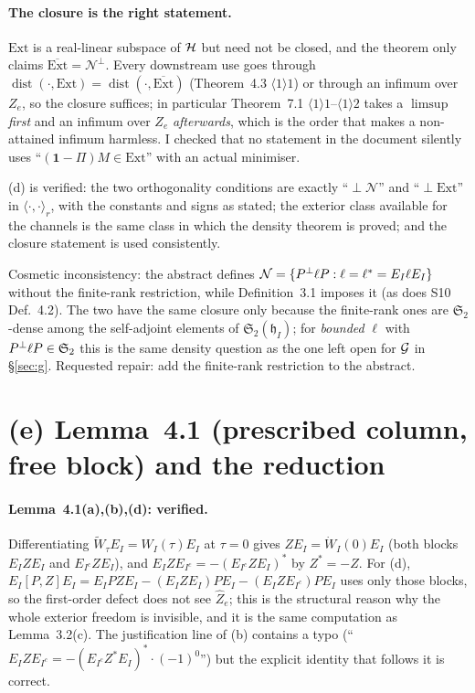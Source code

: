 \documentclass[11pt]{article}
\newcommand{\Wt}{\widetilde W}\newcommand{\Om}{\Omega}\newcommand{\Gm}{\Gamma}
\newcommand{\Stwo}{\mathfrak S_2}\newcommand{\Sone}{\mathfrak S_1}
\newcommand{\ip}[2]{\langle #1,#2\rangle}\newcommand{\one}{\mathbf 1}
\newcommand{\Ext}{\mathrm{Ext}}\newcommand{\Nvis}{\mathcal N}
\DeclareMathOperator{\dist}{dist}\DeclareMathOperator{\ran}{ran}
\begin{document}
\paragraph{The closure is the right statement.}  $\Ext$ is a real-linear subspace of $\mathcal H$
but need not be closed, and the theorem only claims $\overline{\Ext}=\Nvis^{\perp}$.  Every
downstream use goes through $\dist(\cdot,\Ext)=\dist(\cdot,\overline{\Ext})$
(Theorem~4.3 $\langle1\rangle1$) or through an infimum over $Z_e$, so the closure suffices;
in particular Theorem~7.1 $\langle1\rangle1$--$\langle1\rangle2$ takes a
$\limsup$ \emph{first} and an infimum over $Z_e$ \emph{afterwards}, which is the order that
makes a non-attained infimum harmless.  I checked that no statement in the document silently
uses ``$(\one-\Pi)M\in\Ext$'' with an actual minimiser.

\begin{verdictok}
(d) is verified: the two orthogonality conditions are exactly ``$\perp\Nvis$'' and
``$\perp\Ext$'' in $\ip\cdot\cdot_r$, with the constants and signs as stated; the exterior
class available for the channels is the same class in which the density theorem is proved;
and the closure statement is used consistently.
\end{verdictok}

\begin{verdictgap}
Cosmetic inconsistency: the abstract defines
$\Nvis=\{\Pperp\ell P:\ell=\ell^*=E_I\ell E_I\}$ without the finite-rank restriction, while
Definition~3.1 imposes it (as does S10 Def.~4.2).  The two have the same closure only
because the finite-rank ones are $\Stwo$-dense among the self-adjoint elements of
$\Stwo(\mathfrak h_I)$; for \emph{bounded} $\ell$ with $\Pperp\ell P\in\Stwo$ this is the
same density question as the one left open for $\mathcal G$ in \S\ref{sec:g}.  Requested repair:
add the finite-rank restriction to the abstract.
\end{verdictgap}

\section{(e) Lemma~4.1 (prescribed column, free block) and the reduction}\label{sec:e}

\paragraph{Lemma~4.1(a),(b),(d): verified.}  Differentiating $\Wt_\tau E_I=W_I(\tau)E_I$ at
$\tau=0$ gives $ZE_I=\dot W_I(0)E_I$ (both blocks $E_IZE_I$ and $E_{I^c}ZE_I$), and
$E_IZE_{I^c}=-(E_{I^c}ZE_I)^*$ by $Z^*=-Z$.  For (d),
$E_I[P,Z]E_I=E_IPZE_I-(E_IZE_I)PE_I-(E_IZE_{I^c})PE_I$ uses only those blocks, so the
first-order defect does not see $\widehat Z_e$; this is the structural reason why the whole
exterior freedom is invisible, and it is the same computation as Lemma~3.2(c).  The
justification line of (b) contains a typo (``$E_IZE_{I^c}=-(E_{I^c}Z^*E_I)^*\cdot(-1)^{0}$'')
but the explicit identity that follows it is correct.
\end{document}

